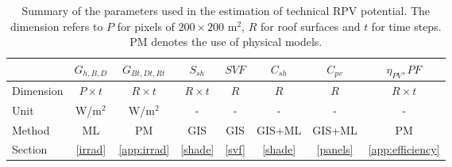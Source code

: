 \begin{table}[tb]
\centering
\footnotesize
\caption{Summary of the parameters used in the estimation of technical RPV potential. The dimension refers to $P$ for pixels of $200 \times 200$ m$^2$, $R$ for roof surfaces and $t$ for time steps. PM denotes the use of physical models.}
\label{tab:vars}
\begin{tabular} {lccccccc} %
\hline 
  & $G_{h,B,D}$ & $G_{Bt,Dt,Rt}$ & $S_{sh}$   & $\mathit{SVF}$  & $C_{sh}$  & $C_{\mathit{pv}}$ & $\eta_{PV}, \mathit{PF}$     
  \\
\hline 
Dimension & $P \times t$ & $R \times t$ & $R \times t$ & $R$   & $R$     & $R$      & $R \times t$  
\\
Unit     & W/m$^2$    & W/m$^2$  & -                          & -                  & -                    & -                     & -                             
\\
Method      & ML & PM & GIS & GIS & GIS+ML & GIS+ML & PM \\
Section      & \ref{irrad}  & \ref{app:irrad}     & \ref{shade}       & \ref{svf} & \ref{shade} & \ref{panels} & \ref{app:efficiency} 
\\  
\hline 
\end{tabular}
\end{table}

